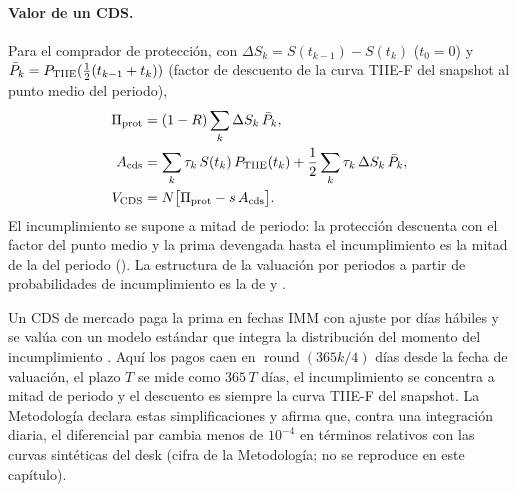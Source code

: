 \begin{sloppypar}
\paragraph{Valor de un CDS.} Para el comprador de protección, con $\Delta S_k=S(t_{k-1})-S(t_k)$ ($t_0=0$) y
$\bar P_k=P_{\mathrm{TIIE}}(\tfrac12(t_{k-1}+t_k))$ (factor de descuento de la curva TIIE-F del snapshot al punto medio del
periodo),
\begin{equation}\label{eq:cap14-cds}
\begin{aligned}
  \Pi_{\mathrm{prot}} &= (1-R)\sum_k \Delta S_k\,\bar P_k,\\
  A_{\mathrm{cds}} &= \sum_k \tau_k\,S(t_k)\,P_{\mathrm{TIIE}}(t_k) + \frac12\sum_k \tau_k\,\Delta S_k\,\bar P_k,\\
  V_{\mathrm{CDS}} &= N\bigl[\Pi_{\mathrm{prot}} - s\,A_{\mathrm{cds}}\bigr].
\end{aligned}
\end{equation}
El incumplimiento se supone a mitad de periodo: la protección descuenta con el factor del punto medio y la prima
devengada hasta el incumplimiento es la mitad de la del periodo
(). La estructura de la valuación por periodos a partir de
probabilidades de incumplimiento es la de \citet{hull2000} y \citet{okane2008}.

\begin{diferencia}
  Un CDS de mercado paga la prima en fechas IMM con ajuste por días hábiles y se valúa con un modelo estándar
  que integra la distribución del momento del incumplimiento \citep{okane2008}. Aquí los pagos caen en
  $\operatorname{round}(365k/4)$ días desde la fecha de valuación, el plazo $T$ se mide como $365\,T$ días, el
  incumplimiento se concentra a mitad de periodo y el descuento es siempre la curva TIIE-F del snapshot. La
  Metodología declara estas simplificaciones y afirma que, contra una integración diaria, el diferencial par cambia
  menos de $10^{-4}$ en términos relativos con las curvas sintéticas del desk (cifra de la Metodología; no se
  reproduce en este capítulo).
\end{diferencia}


\end{sloppypar}
